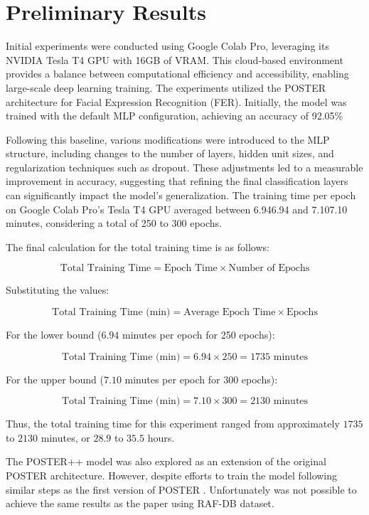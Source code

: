 \chapter{Preliminary Results}
\label{chapter:preliminary-results}

Initial experiments were conducted using Google Colab Pro, leveraging its NVIDIA Tesla T4 GPU with 16GB of VRAM. This cloud-based environment provides a balance between computational efficiency and accessibility, enabling large-scale deep learning training. The experiments utilized the POSTER architecture for Facial Expression Recognition (FER). Initially, the model was trained with the default MLP configuration, achieving an accuracy of 92.05\%

Following this baseline, various modifications were introduced to the MLP structure, including changes to the number of layers, hidden unit sizes, and regularization techniques such as dropout. These adjustments led to a measurable improvement in accuracy, suggesting that refining the final classification layers can significantly impact the model's generalization. The training time per epoch on Google Colab Pro’s Tesla T4 GPU averaged between 6.946.94 and 7.107.10 minutes, considering a total of 250 to 300 epochs.


The final calculation for the total training time is as follows:

$$
\text{Total Training Time} = \text{Epoch Time} \times \text{Number of Epochs}
$$

Substituting the values:

$$
\text{Total Training Time (min)} = \text{Average Epoch Time} \times \text{Epochs}
$$

For the lower bound (\( 6.94 \) minutes per epoch for 250 epochs):

$$
\text{Total Training Time (min)} = 6.94 \times 250 = 1735 \text{ minutes}
$$

For the upper bound (\( 7.10 \) minutes per epoch for 300 epochs):

$$
\text{Total Training Time (min)} = 7.10 \times 300 = 2130 \text{ minutes}
$$

Thus, the total training time for this experiment ranged from approximately \( 1735 \) to \( 2130 \) minutes, or \( 28.9 \) to \( 35.5 \) hours.


The POSTER++ model \cite{mao_poster_2023} was also explored as an extension of the original POSTER architecture. However, despite efforts to train the model following similar steps as the first version of POSTER \cite{zheng_poster_2022}. Unfortunately was not possible to achieve the same results as the paper using RAF-DB dataset. 
